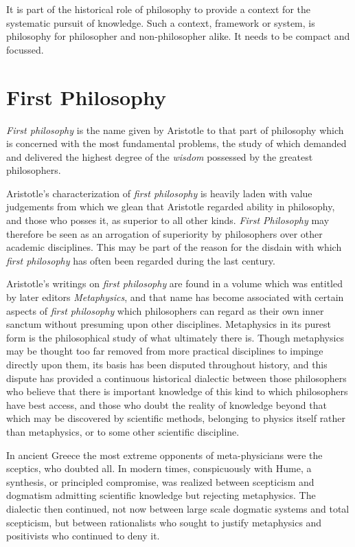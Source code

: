 It is part of the historical role of philosophy to provide a context for the systematic pursuit of knowledge.
Such a context, framework or system, is philosophy for philosopher and non-philosopher alike.
It needs to be compact and focussed.

\section{First Philosophy}

{\it First philosophy} is the name given by Aristotle to that part of philosophy which is concerned with the most fundamental problems, the study of which demanded and delivered the highest degree of the {\it wisdom} possessed by the greatest philosophers.

Aristotle's characterization of {\it first philosophy} is heavily laden with value judgements from which we glean that Aristotle regarded ability in philosophy, and those who posses it, as superior to all other kinds.
{\it First Philosophy} may therefore be seen as an arrogation of superiority by philosophers over other academic disciplines.
This may be part of the reason for the disdain with which {\it first philosophy} has often been regarded during the last century.

Aristotle's writings on {\it first philosophy} are found in a volume which was entitled by later editors {\it Metaphysics}, and that name has become associated with certain aspects of {\it first philosophy} which philosophers can regard as their own inner sanctum without presuming upon other disciplines.
Metaphysics in its purest form is the philosophical study of what ultimately there is.
Though metaphysics may be thought too far removed from more practical disciplines to impinge directly upon them, its basis has been disputed throughout history, and this dispute has provided a continuous historical dialectic between those philosophers who believe that there is important knowledge of this kind to which philosophers have best access, and those who doubt the reality of knowledge beyond that which may be discovered by scientific methods, belonging to physics itself rather than metaphysics, or to some other scientific discipline.

In ancient Greece the most extreme opponents of meta-physicians were the sceptics, who doubted all.
In modern times, conspicuously with Hume, a synthesis, or principled compromise, was realized between scepticism and dogmatism admitting scientific knowledge but rejecting metaphysics.
The dialectic then continued, not now between large scale dogmatic systems and total scepticism, but between rationalists who sought to justify metaphysics and positivists who continued to deny it.

